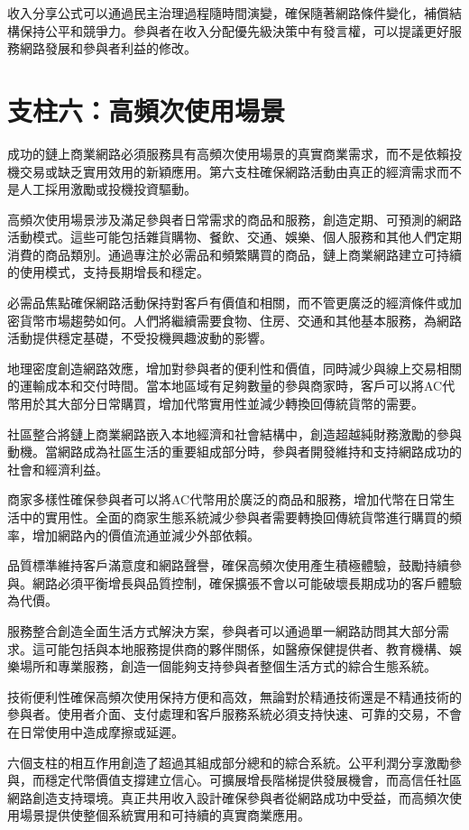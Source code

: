 \documentclass[
  Letterpaper,
]{scrbook}
\begin{document}
收入分享公式可以通過民主治理過程隨時間演變，確保隨著網路條件變化，補償結構保持公平和競爭力。參與者在收入分配優先級決策中有發言權，可以提議更好服務網路發展和參與者利益的修改。

\section{支柱六：高頻次使用場景}\label{ux652fux67f1ux516dux9ad8ux983bux6b21ux4f7fux7528ux5834ux666f}

成功的鏈上商業網路必須服務具有高頻次使用場景的真實商業需求，而不是依賴投機交易或缺乏實用效用的新穎應用。第六支柱確保網路活動由真正的經濟需求而不是人工採用激勵或投機投資驅動。

高頻次使用場景涉及滿足參與者日常需求的商品和服務，創造定期、可預測的網路活動模式。這些可能包括雜貨購物、餐飲、交通、娛樂、個人服務和其他人們定期消費的商品類別。通過專注於必需品和頻繁購買的商品，鏈上商業網路建立可持續的使用模式，支持長期增長和穩定。

必需品焦點確保網路活動保持對客戶有價值和相關，而不管更廣泛的經濟條件或加密貨幣市場趨勢如何。人們將繼續需要食物、住房、交通和其他基本服務，為網路活動提供穩定基礎，不受投機興趣波動的影響。

地理密度創造網路效應，增加對參與者的便利性和價值，同時減少與線上交易相關的運輸成本和交付時間。當本地區域有足夠數量的參與商家時，客戶可以將AC代幣用於其大部分日常購買，增加代幣實用性並減少轉換回傳統貨幣的需要。

社區整合將鏈上商業網路嵌入本地經濟和社會結構中，創造超越純財務激勵的參與動機。當網路成為社區生活的重要組成部分時，參與者開發維持和支持網路成功的社會和經濟利益。

商家多樣性確保參與者可以將AC代幣用於廣泛的商品和服務，增加代幣在日常生活中的實用性。全面的商家生態系統減少參與者需要轉換回傳統貨幣進行購買的頻率，增加網路內的價值流通並減少外部依賴。

品質標準維持客戶滿意度和網路聲譽，確保高頻次使用產生積極體驗，鼓勵持續參與。網路必須平衡增長與品質控制，確保擴張不會以可能破壞長期成功的客戶體驗為代價。

服務整合創造全面生活方式解決方案，參與者可以通過單一網路訪問其大部分需求。這可能包括與本地服務提供商的夥伴關係，如醫療保健提供者、教育機構、娛樂場所和專業服務，創造一個能夠支持參與者整個生活方式的綜合生態系統。

技術便利性確保高頻次使用保持方便和高效，無論對於精通技術還是不精通技術的參與者。使用者介面、支付處理和客戶服務系統必須支持快速、可靠的交易，不會在日常使用中造成摩擦或延遲。

六個支柱的相互作用創造了超過其組成部分總和的綜合系統。公平利潤分享激勵參與，而穩定代幣價值支撐建立信心。可擴展增長階梯提供發展機會，而高信任社區網路創造支持環境。真正共用收入設計確保參與者從網路成功中受益，而高頻次使用場景提供使整個系統實用和可持續的真實商業應用。
\end{document}

